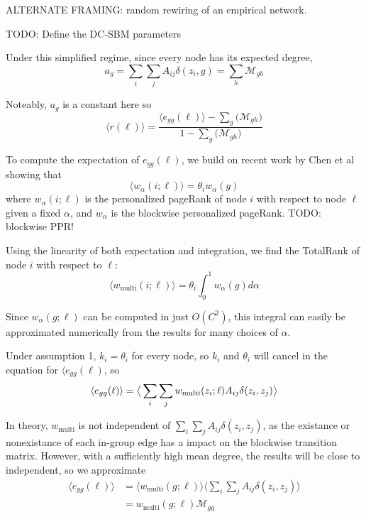 \documentclass[12pt]{article}
\begin{document}
ALTERNATE FRAMING: random rewiring of an empirical network.

TODO: Define the DC-SBM parameters

Under this simplified regime, since every node has its expected degree,
\begin{equation}
  a_g = \sum_i \sum_j A_{ij} \delta(z_i, g) = \sum_h \mathcal{M}_{gh}
\end{equation}

Noteably, $a_g$ is a constant here so 
\begin{equation}
  \langle r(\ell) \rangle = \frac{\langle e_{gg}(\ell) \rangle - \sum_g \big( \mathcal{M}_{gh} \big)}{1 - \sum_g \big( \mathcal{M}_{gh} \big)}
\end{equation}

To compute the expectation of $e_{gg}(\ell)$, we build on recent work by Chen et al \cite{chen:2020} showing that
\begin{equation}
  \langle w_\alpha (i ; \ell) \rangle = \theta_i w_\alpha(g)
\end{equation}
where $w_\alpha(i;\ell)$ is the personalized pageRank of node $i$ with respect to node $\ell$ given a fixed $\alpha$, and $w_\alpha$ is the blockwise personalized pageRank.
TODO: blockwise PPR! 

Using the linearity of both expectation and integration, we find the TotalRank \cite{boldi:2005} \cite{Peel:2018} of node $i$ with respect to $\ell$:
\begin{equation}
  \langle w_\text{multi} (i ; \ell) \rangle = \theta_i \int_0^1 w_\alpha(g) d\alpha
\end{equation}

Since $w_\alpha (g;\ell)$ can be computed in just $O(C^2)$, this integral can easily be approximated numerically from the results for many choices of $\alpha$.

Under assumption 1, $k_i = \theta_i$ for every node, so $k_i$ and $\theta_i$ will cancel in the equation for $\langle e_{gg} (\ell)$, so
\begin{equation}
    \langle e_{gg}(\ell) \rangle = \big \langle \sum_i \sum_j w_\text{multi}(z_i; \ell) A_{ij} \delta(z_i, z_j) \big \rangle\\
\end{equation}

In theory, $w_\text{multi}$ is not independent of $\sum_i \sum_j A_{ij} \delta(z_i, z_j)$, as the existance or nonexistance of each in-group edge has a impact on the blockwise transition matrix.  However, with a sufficiently high mean degree, the results will be close to independent, so we approximate
\begin{equation}
  \begin{aligned}
    \langle e_{gg}(\ell) \rangle &= \big \langle w_\text{multi}(g; \ell) \big \rangle \big \langle \sum_i \sum_j A_{ij} \delta(z_i, z_j) \big \rangle \\
    &= w_\text{multi}(g; \ell) \mathcal{M}_{gg}
  \end{aligned}
\end{equation}
\end{document}
